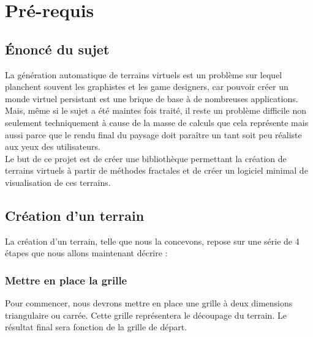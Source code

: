 \chapter{Pré-requis}
\section{Énoncé du sujet}
La génération automatique de terrains virtuels est un problème sur lequel planchent souvent les graphistes et les game designers, car pouvoir créer un monde virtuel persistant est une brique de base à de nombreuses applications. Mais, même si le sujet a été maintes fois traité, il reste un problème difficile non seulement techniquement à cause de la masse de calculs que cela représente mais aussi parce que le rendu final du paysage doit paraître un tant soit peu réaliste aux yeux des utilisateurs.\\

Le but de ce projet est de créer une bibliothèque permettant la création de terrains virtuels à partir de méthodes fractales et de créer un logiciel minimal de visualisation de ces terrains.\\

\section{Création d'un terrain}
La création d'un terrain, telle que nous la concevons, repose sur une série de 4 étapes que nous allons maintenant décrire :

\subsection{Mettre en place la grille}
Pour commencer, nous devrons mettre en place une grille à deux dimensions triangulaire ou carrée. Cette grille représentera le découpage du terrain. Le résultat final sera fonction de la grille de départ.

